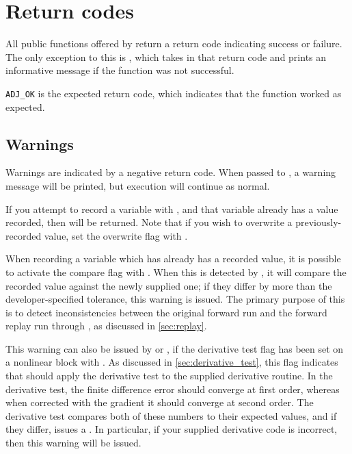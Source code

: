\chapter{Return codes}

All public functions offered by \libadjoint return a return code indicating
success or failure. The only exception to this is , which
takes in that return code and prints an informative message if the function was
not successful.

\texttt{ADJ_OK} is the expected return code, which indicates that the function
worked as expected.

\section{Warnings}
Warnings are indicated by a negative return code. When passed to ,
a warning message will be printed, but execution will continue as normal.

If you attempt to record a variable with , and that variable
already has a value recorded, then  will be returned.
Note that if you wish to overwrite a previously-recorded value, set the overwrite flag
with .

When recording a variable which has already has a recorded value, it is possible to activate the
compare flag with . When this is detected by ,
it will compare the recorded value against the newly supplied one; if they differ by more than
the developer-specified tolerance, this warning is issued. The primary purpose of this is to detect
inconsistencies between the original forward run and the forward replay run through \libadjoint,
as discussed in \autoref{sec:replay}.

This warning can also be issued by  or ,
if the derivative test flag has been set on a nonlinear block with .
As discussed in \autoref{sec:derivative_test}, this flag indicates that \libadjoint should apply the derivative
test to the supplied derivative routine. In the derivative test, the finite difference error should converge
at first order, whereas when corrected with the gradient it should converge at second order. The derivative test
compares both of these numbers to their expected values, and if they differ, issues a .
In particular, if your supplied derivative code is incorrect, then this warning will be issued.

